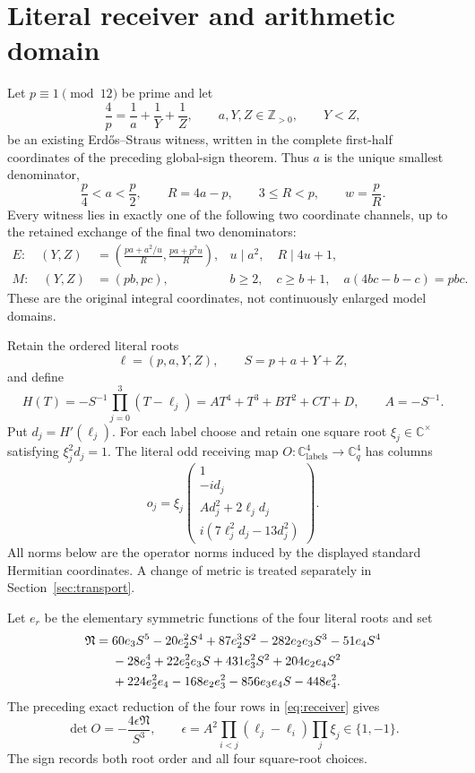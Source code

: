\section{Literal receiver and arithmetic domain}

Let \(p\equiv1\pmod {12}\) be prime and let
\[
 \frac4p=\frac1a+\frac1Y+\frac1Z,
 \qquad a,Y,Z\in\mathbb Z_{>0},\qquad Y<Z,
\]
be an existing Erd\H{o}s--Straus witness, written in the complete first-half
coordinates of the preceding global-sign theorem. Thus \(a\) is the unique
smallest denominator,
\[
 \frac p4<a<\frac p2,\qquad R=4a-p,\qquad 3\le R<p,\qquad w=\frac pR.
\]
Every witness lies in exactly one of the following two coordinate channels,
up to the retained exchange of the final two denominators:
\begin{align}
 E:\quad
 (Y,Z)&=\left(\frac{pa+a^2/u}{R},\frac{pa+p^2u}{R}\right),
 &u\mid a^2,\quad R\mid4u+1,\label{eq:Echart}\tag{E}\\
 M:\quad
 (Y,Z)&=(pb,pc),
 &b\ge2,\quad c\ge b+1,\quad
 a(4bc-b-c)=pbc.\label{eq:Mchart}\tag{M}
\end{align}
These are the original integral coordinates, not continuously enlarged model
domains.

Retain the ordered literal roots
\[
 \ell=(p,a,Y,Z),\qquad S=p+a+Y+Z,
\]
and define
\[
 H(T)=-S^{-1}\prod_{j=0}^3(T-\ell_j)
     =AT^4+T^3+BT^2+CT+D,\qquad A=-S^{-1}.
\]
Put \(d_j=H'(\ell_j)\). For each label choose and retain one square root
\(\xi_j\in\mathbb C^\times\) satisfying
\(\xi_j^2d_j=1\). The literal odd receiving map
\(O:\mathbb C^4_{\mathrm{labels}}\to\mathbb C^4_q\) has columns
\begin{equation}\label{eq:receiver}
 o_j=\xi_j
 \begin{pmatrix}
 1\\-i d_j\\A d_j^2+2\ell_jd_j\\
 i(7\ell_j^2d_j-13d_j^2)
 \end{pmatrix}.
\end{equation}
All norms below are the operator norms induced by the displayed standard
Hermitian coordinates. A change of metric is treated separately in
Section~\ref{sec:transport}.

Let \(e_r\) be the elementary symmetric functions of the four literal roots
and set
\begin{align}
 \mathfrak N={}&60e_3S^5-20e_2^2S^4+87e_2^3S^2-282e_2e_3S^3-51e_4S^4\notag\\
 &-28e_2^4+22e_2^2e_3S+431e_3^2S^2+204e_2e_4S^2\notag\\
 &+224e_2^2e_4-168e_2e_3^2-856e_3e_4S-448e_4^2.\label{eq:N}
\end{align}
The preceding exact reduction of the four rows in \eqref{eq:receiver} gives
\begin{equation}\label{eq:detO}
 \det O=-\frac{4\epsilon\mathfrak N}{S^3},
 \qquad
 \epsilon=A^2\prod_{i<j}(\ell_j-\ell_i)\prod_j\xi_j\in\{1,-1\}.
\end{equation}
The sign records both root order and all four square-root choices.

